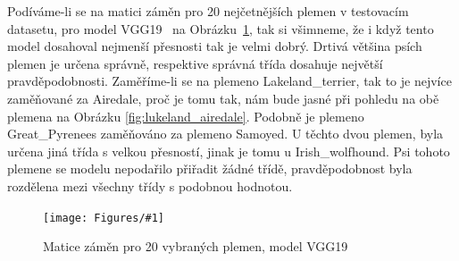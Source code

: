 \documentclass[a4paper,12pt]{article}
\newcommand{\image}[4]{\begin{figure}[ht!] \centering \texttt{[image: Figures/\#1]} \caption{#2} \label{#3} \end{figure}}
\begin{document}
Podíváme-li se na matici záměn pro 20 nejčetnějších plemen v testovacím datasetu, pro model VGG19~\cite{vgg19} na Obrázku~\ref{fig:vgg19_conf_mat}, tak si všimneme,  že i když tento model dosahoval nejmenší přesnosti tak je velmi dobrý. Drtivá většina psích plemen je určena správně, respektive správná třída dosahuje největší pravděpodobnosti. Zaměříme-li se na plemeno Lakeland\_terrier, tak to je nejvíce zaměňované za Airedale, proč je tomu tak, nám bude jasné při pohledu na obě plemena na Obrázku \ref{fig:lukeland_airedale}. Podobně je plemeno Great\_Pyrenees zaměňováno za plemeno Samoyed. U těchto dvou plemen, byla určena jiná třída s velkou přesností, jinak je tomu u Irish\_wolfhound. Psi tohoto plemene se modelu nepodařilo přiřadit žádné třídě, pravděpodobnost byla rozdělena mezi všechny třídy s podobnou hodnotou.

\image{vgg19_confmat.pdf}{Matice záměn pro 20 vybraných plemen, model VGG19}{fig:vgg19_conf_mat}{1.0}
\end{document}
